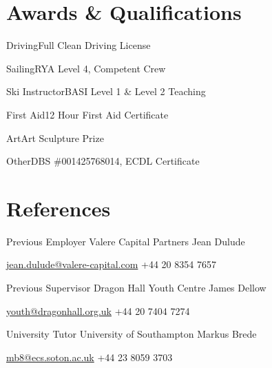 \documentclass{tccv}
\begin{document}
\vfill

\section{Awards \& Qualifications}

\begin{factlist}
\item{Driving}{Full Clean Driving License}
\item{Sailing}{RYA Level 4, Competent Crew}
\item{Ski Instructor}{BASI Level 1 \& Level 2 Teaching}
\item{First Aid}{12 Hour First Aid Certificate}
\item{Art}{Art Sculpture Prize}
\item{Other}{DBS \#001425768014, ECDL Certificate}
\end{factlist}


\section{References}

\begin{eventlist}

\item{Previous Employer}
     {Valere Capital Partners}
     {Jean Dulude}

\href{mailto:jean.dulude@valere-capital.com}{jean.dulude@valere-capital.com}
\newline
+44 20 8354 7657

\bigskip


\item{Previous Supervisor}
     {Dragon Hall Youth Centre}
     {James Dellow}

\href{mailto:youth@dragonhall.org.uk}{youth@dragonhall.org.uk}
\newline
+44 20 7404 7274

\bigskip


\item{University Tutor}
     {University of Southampton}
     {Markus Brede}

\href{mailto:mb8@ecs.soton.ac.uk}{mb8@ecs.soton.ac.uk}
\newline
+44 23 8059 3703

\end{eventlist}
\end{document}

